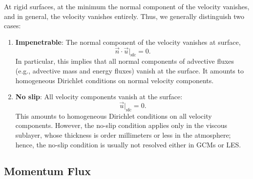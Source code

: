 \documentclass{report}
\begin{document}
At rigid surfaces, at the minimum the normal component of the velocity vanishes, and in general, the velocity vanishes entirely. Thus, we generally distinguish two cases:
\begin{enumerate}
    \item \textbf{Impenetrable}: The normal component of the velocity vanishes at surface,
    \[
    \vec{n} \cdot \vec{u}\bigl|_\mathrm{sfc}  = 0.
    \]
    In particular, this implies that all normal components of advective fluxes (e.g., advective mass and energy fluxes) vanish at the surface. It amounts to homogeneous Dirichlet conditions on normal velocity components.
    \item \textbf{No slip}: All velocity components vanish at the surface:
    \[
    \vec{u}\bigl|_\mathrm{sfc} =  0.
    \]
    This amounts to homogeneous Dirichlet conditions on all velocity components. However, the no-slip condition applies only in the viscous sublayer, whose thickness is order millimeters or less in the atmosphere; hence, the no-slip condition is usually not resolved either in GCMs or LES.
\end{enumerate}

\subsection{Momentum Flux}
\end{document}
